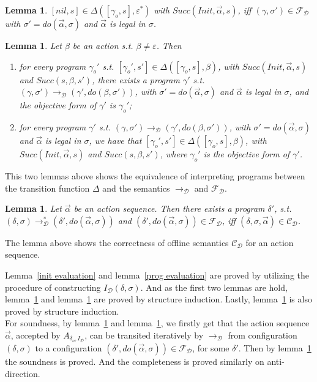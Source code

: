\documentclass[letterpaper]{article}
\newtheorem{lemma}[theorem]{Lemma}
\begin{document}
\begin{lemma}\label{nfa final}
$[nil,s]\in\Delta([\gamma_o,s],\varepsilon^*)$ with $Succ(Init,\vec{\alpha},s)$, iff $(\gamma,\sigma')\in\mathcal{F_D}$ with $\sigma'=do(\vec{\alpha},\sigma)$ and $\vec{\alpha}$ is legal in $\sigma$.
\end{lemma}

\begin{lemma}\label{nfa trans}
Let $\beta$ be an action s.t. $\beta\neq\varepsilon$. Then
\begin{enumerate}
  \item for every program $\gamma_o'$ s.t. $[\gamma_o',s']\in\Delta([\gamma_o,s],\beta)$, with $Succ(Init,\vec{\alpha},s)$ and $Succ(s,\beta,s')$, there exists a program $\gamma'$ s.t. $(\gamma,\sigma')\rightarrow_\mathcal{D}(\gamma',do(\beta,\sigma'))$, with $\sigma'=do(\vec{\alpha},\sigma)$ and $\vec{\alpha}$ is legal in $\sigma$, and the objective form of $\gamma'$ is $\gamma_o'$;
  \item for every program $\gamma'$ s.t. $(\gamma,\sigma')\rightarrow_\mathcal{D}(\gamma',do(\beta,\sigma'))$, with $\sigma'=do(\vec{\alpha},\sigma)$ and $\vec{\alpha}$ is legal in $\sigma$, we have that $[\gamma_o',s']\in\Delta([\gamma_o,s],\beta)$, with $Succ(Init,\vec{\alpha},s)$ and $Succ(s,\beta,s')$, where $\gamma_o'$ is the objective form of $\gamma'$.
\end{enumerate}
\end{lemma}

This two lemmas above shows the equivalence of interpreting programs between the transition function $\Delta$ and the semantics $\rightarrow_\mathcal{D}$ and $\mathcal{F_D}$.

\begin{lemma}\label{trans final bdo}
Let $\vec{\alpha}$ be an action sequence. Then
there exists a program $\delta'$, s.t. $(\delta,\sigma)\rightarrow_\mathcal{D}^*(\delta',do(\vec{\alpha},\sigma))$ and $(\delta',do(\vec{\alpha},\sigma))\in\mathcal{F_D}$, iff
$(\delta,\sigma,\vec{\alpha})\in\mathcal{C_D}$.
\end{lemma}

The lemma above shows the correctness of offline semantics $\mathcal{C_D}$ for an action sequence.

Lemma~\ref{init evaluation} and lemma~\ref{prog evaluation} are proved by utilizing the procedure of constructing $I_\mathcal{D}(\delta,\sigma)$. And as the first two lemmas are hold, lemma~\ref{nfa final} and lemma~\ref{nfa trans} are proved by structure induction. Lastly, lemma~\ref{trans final bdo} is also proved by structure induction.
\\

For soundness, by lemma~\ref{nfa final} and lemma~\ref{nfa trans}, we firstly get that the action sequence $\vec{\alpha}$, accepted by $A_{\delta_o,I_\mathcal{D}}$, can be transited iteratively by $\rightarrow_\mathcal{D}$ from configuration $(\delta,\sigma)$ to a configuration $(\delta',do(\vec{\alpha},\sigma))\in \mathcal{F_D}$, for some $\delta'$. Then by lemma~\ref{trans final bdo} the soundness is proved. And the completeness is proved similarly on anti-direction.
\end{document}
